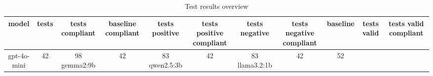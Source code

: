 
  \begin{table}[h!]
  \centering
  \begin{tabular}{|c|c|c|c|c|c|c|c|c|c|c|}
  \hline
  model & tests & tests compliant & baseline compliant & tests positive & tests positive compliant & tests negative & tests negative compliant & baseline & tests valid & tests valid compliant \\
  \hline
  gpt-4o-mini & 42 & 98%
\hline
gemma2:9b & 42 & 83%
\hline
qwen2.5:3b & 42 & 83%
\hline
llama3.2:1b & 42 & 52%
  \end{tabular}
  \caption{Test results overview}
  
  \end{table}
  